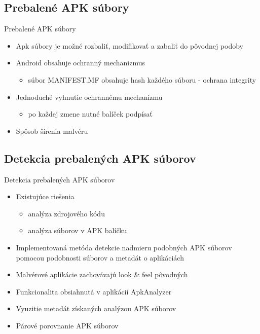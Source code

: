 \documentclass{beamer}
\begin{document}
\subsection{Prebalené APK súbory}
  \begin{frame}[label=lists]{Prebalené APK súbory}
	\begin{itemize}
	 	\item Apk súbory je možné rozbaliť, modifikovať a zabaliť do pôvodnej podoby
	 	\item Android obsahuje ochranný mechanizmus
	 	 \begin{itemize}
	 	 	\item súbor MANIFEST.MF obsahuje hash každého súboru - ochrana 	integrity
		 \end{itemize}	 
		 \item Jednoduché vyhnutie ochrannému mechanizmu 
	 	 \begin{itemize}
	 	 	\item po každej zmene nutné balíček podpísať
		 \end{itemize}	 
		 \item Spôsob šírenia malvéru	  
	\end{itemize}
  \end{frame} 
  
  \subsection{Detekcia prebalených APK súborov}
  \begin{frame}[label=lists]{Detekcia prebalených APK súborov}
	\begin{itemize}
		\item Existujúce riešenia
			\begin{itemize}
				\item analýza zdrojového kódu
				\item analýza súborov v APK balíčku
			\end{itemize}
	 	\item Implementovaná metóda detekcie nadmieru podobných APK súborov pomocou podobnosti súborov a metadát o aplikáciách
	 	\item Malvérové aplikácie zachovávajú look \& feel pôvodných
	 	\item Funkcionalita obsiahnutá v aplikácií ApkAnalyzer
	 	\item Vyuzitie metadát získaných analýzou APK súborov
	 	\item Párové porovnanie APK súborov
	\end{itemize}
  \end{frame} 
  
\end{document}
